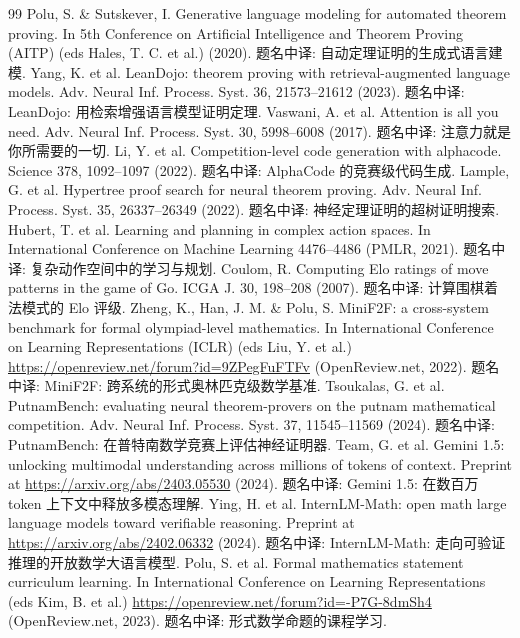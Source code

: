 \begin{thebibliography}{99}
 Polu, S. \& Sutskever, I. Generative language modeling for automated theorem proving. In 5th Conference on Artificial Intelligence and Theorem Proving (AITP) (eds Hales, T. C. et al.) (2020). 题名中译: 自动定理证明的生成式语言建模.
 Yang, K. et al. LeanDojo: theorem proving with retrieval-augmented language models. Adv. Neural Inf. Process. Syst. 36, 21573--21612 (2023). 题名中译: LeanDojo: 用检索增强语言模型证明定理.
 Vaswani, A. et al. Attention is all you need. Adv. Neural Inf. Process. Syst. 30, 5998--6008 (2017). 题名中译: 注意力就是你所需要的一切.
 Li, Y. et al. Competition-level code generation with alphacode. Science 378, 1092--1097 (2022). 题名中译: AlphaCode 的竞赛级代码生成.
 Lample, G. et al. Hypertree proof search for neural theorem proving. Adv. Neural Inf. Process. Syst. 35, 26337--26349 (2022). 题名中译: 神经定理证明的超树证明搜索.
 Hubert, T. et al. Learning and planning in complex action spaces. In International Conference on Machine Learning 4476--4486 (PMLR, 2021). 题名中译: 复杂动作空间中的学习与规划.
 Coulom, R. Computing Elo ratings of move patterns in the game of Go. ICGA J. 30, 198--208 (2007). 题名中译: 计算围棋着法模式的 Elo 评级.
 Zheng, K., Han, J. M. \& Polu, S. MiniF2F: a cross-system benchmark for formal olympiad-level mathematics. In International Conference on Learning Representations (ICLR) (eds Liu, Y. et al.) \url{https://openreview.net/forum?id=9ZPegFuFTFv} (OpenReview.net, 2022). 题名中译: MiniF2F: 跨系统的形式奥林匹克级数学基准.
 Tsoukalas, G. et al. PutnamBench: evaluating neural theorem-provers on the putnam mathematical competition. Adv. Neural Inf. Process. Syst. 37, 11545--11569 (2024). 题名中译: PutnamBench: 在普特南数学竞赛上评估神经证明器.
 Team, G. et al. Gemini 1.5: unlocking multimodal understanding across millions of tokens of context. Preprint at \url{https://arxiv.org/abs/2403.05530} (2024). 题名中译: Gemini 1.5: 在数百万 token 上下文中释放多模态理解.
 Ying, H. et al. InternLM-Math: open math large language models toward verifiable reasoning. Preprint at \url{https://arxiv.org/abs/2402.06332} (2024). 题名中译: InternLM-Math: 走向可验证推理的开放数学大语言模型.
 Polu, S. et al. Formal mathematics statement curriculum learning. In International Conference on Learning Representations (eds Kim, B. et al.) \url{https://openreview.net/forum?id=-P7G-8dmSh4} (OpenReview.net, 2023). 题名中译: 形式数学命题的课程学习.

\end{thebibliography}
